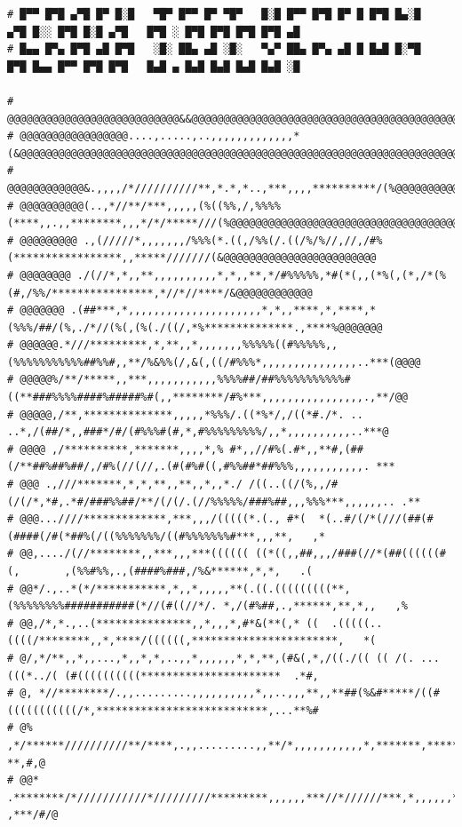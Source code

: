 \documentclass[11pt]{article}
\begin{document}
\begin{enumerate}
\begin{verbatim}
# █▀▀ █▀█ ▄▀█ █▀ █░█   ▀█▀ █▀▀ █▀ ▀█▀   █░█ █▀▀ █▀█ █▀ █ █▀█ █▄░█   ▄▀█ █░░ █▀█ █░█ ▄▀█   █▀█ ░ █▀█ █▀█ █▀█ █▀█ ▄█
# █▄▄ █▀▄ █▀█ ▄█ █▀█   ░█░ ██▄ ▄█ ░█░   ▀▄▀ ██▄ █▀▄ ▄█ █ █▄█ █░▀█   █▀█ █▄▄ █▀▀ █▀█ █▀█   █▄█ ▄ █▄█ █▄█ █▄█ █▄█ ░█

# @@@@@@@@@@@@@@@@@@@@@@@@@@@&&@@@@@@@@@@@@@@@@@@@@@@@@@@@@@@@@@@@@@@@@@@@@@@@@@@@@@@@@@@@@@@@@@@@@@@@@@@@@@@@@@@@@@@
# @@@@@@@@@@@@@@@@@....,.....,..,,,,,,,,,,,,,*(&@@@@@@@@@@@@@@@@@@@@@@@@@@@@@@@@@@@@@@@@@@@@@@@@@@@@@@@@@@@@@@@@@@@@@
# @@@@@@@@@@@@&.,,,,/*//////////**,*.*,*..,***,,,,**********/(%@@@@@@@@@@@@@@@@@@@@@@@@@@@@@@@@@@@@@@@@@@@@@@@@@@@@@@
# @@@@@@@@@@(..,*//**/***,,,,,(%((%%,/,%%%%(****,,.,,********,,,*/*/*****///(%@@@@@@@@@@@@@@@@@@@@@@@@@@@@@@@@@@@@@@@
# @@@@@@@@@ .,(/////*,,,,,,,/%%%(*.((,/%%(/.((/%/%//,//,/#%(*****************,,*****///////(&@@@@@@@@@@@@@@@@@@@@@@@@
# @@@@@@@@ ./(//*,*,,**,,,,,,,,,,*,*,,**,*/#%%%%%,*#(*(,,(*%(,(*,/*(%(#,/%%/****************,*//*//****/&@@@@@@@@@@@@
# @@@@@@@ .(##***,*,,,,,,,,,,,,,,,,,,,,,*,*,,****,*,****,*(%%%/##/(%,./*//(%(,(%(./((/,*%**************.,****%@@@@@@@
# @@@@@@.*///*********,*,**,,*,,,,,,,%%%%%((#%%%%%,,(%%%%%%%%%%%##%%#,,**/%&%%(/,&(,((/#%%%*,,,,,,,,,,,,,,,..***(@@@@
# @@@@@%/**/*****,,***,,,,,,,,,,,%%%%##/##%%%%%%%%%%%#((**###%%%%####%#####%#(,,********/#%***,,,,,,,,,,,,,,,,.,**/@@
# @@@@@,/**,**************,,,,,*%%%/.((*%*/,/((*#./*. .. ..*,/(##/*,,###*/#/(#%%%#(#,*,#%%%%%%%%%/,,*,,,,,,,,,,..***@
# @@@@ ,/**********,*******,,,,*,% #*,,//#%(.#*,,**#,(##(/**##%##%##/,/#%(//(//,.(#(#%#((,#%%##*##%%%,,,,,,,,,,,. ***
# @@@ .,///*******,*,*,**,,**,,*,,*./ /((..((/(%,,/#(/(/*,*#,.*#/###%%##/**/(/(/.(//%%%%%/###%##,,,%%%***,,,,,,.. .**
# @@@...////*************,***,,,/(((((*.(., #*(  *(..#/(/*(///(##(#(####(/#(*##%(/((%%%%%%%/((#%%%%%%%#***,,,**,   ,*
# @@,..../(//********,,***,,,***(((((( ((*((,,##,,,/###(//*(##((((((#(,       ,(%%#%%,.,(####%###,/%&******,*,*,   .(
# @@*/.,..*(*/***********,*,,*,,,,,**(.((.(((((((((**,(%%%%%%%%###########(*//(#((//*/. *,/(#%##,.,******,**,*,,   ,%
# @@,/*,*.,..(***************,,*,,,*,#*&(**(,* ((  .(((((..((((/********,,*,****/((((((,***********************,   *(
# @/,*/**,,*,,...,*,,*,*,..,,*,,,,,,*,*,**,(#&(,*,/((./(( (( /(. ...(((*../( (#((((((((((**********************  .*#,
# @, *//********/.,,.........,,,,,,,,,,*,,..,,,**,,**##(%&#*****/((#(((((((((((/*,***************************,...**%#
# @% ,*/******//////////**/****,.,,.........,,**/*,,,,,,,,,,,*,*******,************************************,.. **,#,@
# @@* .********/*///////////*/////////*********,,,,,,***//*//////***,*,,,,,,****************************,... ,***/#/@

\end{verbatim}
\end{enumerate}
\end{document}
